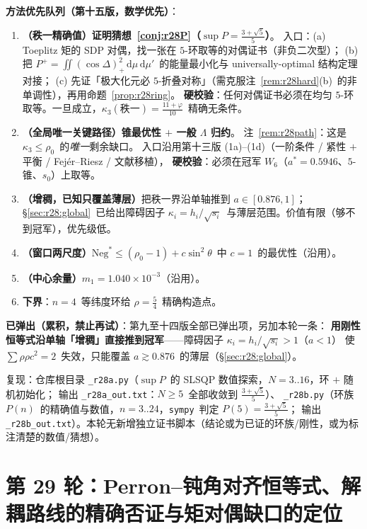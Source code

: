 \documentclass[UTF8,11pt]{ctexart}
\theoremstyle{definition}
\newcommand{\Lam}{\Lambda}
\newcommand{\dd}{\,\mathrm{d}}
\begin{document}
\textbf{方法优先队列（第十五版，数学优先）}：
\begin{enumerate}\itemsep=2pt
\item[\textbf{P1$'$}]\textbf{（秩一精确值）证明猜想~\ref{conj:r28P}（$\sup P=\frac{3+\sqrt5}5$）}。
入口：(a) Toeplitz 矩的 SDP 对偶，找一张在 $5$-环取等的对偶证书（非负二次型）；
(b) 把 $P^+=\iint(\cos\Delta)_+^2\dd\mu\dd\mu'$~的能量最小化与 universally-optimal 结构定理对接；
(c) 先证「极大化元必 $5$-折叠对称」（需克服注~\ref{rem:r28hard}(b)~的非单调性），再用命题~\ref{prop:r28ring}。
\textbf{硬校验}：任何对偶证书必须在均匀 $5$-环取等。一旦成立，$\kappa_3(\text{秩一})=\frac{11+\varphi}{10}$~精确无条件。
\item[\textbf{P1}]\textbf{（全局唯一关键路径）锥最优性 $+$ 一般 $\Lam$ 归约}。
注~\ref{rem:r28path}：这是 $\kappa_3\le\rho_0$~的\emph{唯一}剩余缺口。
入口沿用第十三版 (1a)--(1d)（一阶条件 / 紧性 $+$ 平衡 / Fej\'er--Riesz / 文献移植），
\textbf{硬校验}：必须在冠军 $W_6$（$a^*=0.5946$、$5$-锥、$s_0$）上取等。
\item[\textbf{P2}]\textbf{（增稠，已知只覆盖薄层）}把秩一界沿单轴推到 $a\in[0.876,1]$；
\S\ref{sec:r28:global}~已给出障碍因子 $\kappa_i=h_i/\sqrt{s_i}$~与薄层范围。价值有限（够不到冠军），优先级低。
\item[\textbf{P3}]\textbf{（窗口两尺度）}$\mathrm{Neg}^*\le(\rho_0-1)+c\sin^2\theta$~中 $c=1$~的最优性（沿用）。
\item[\textbf{P4}]\textbf{（中心余量）}$m_1=1.040\times10^{-3}$（沿用）。
\item[\textbf{副}]\textbf{下界}：$n=4$~等纬度环给 $\rho=\frac54$~精确构造点。
\end{enumerate}

\textbf{已弹出（累积，禁止再试）}：第九至十四版全部已弹出项，另加本轮一条：
\textbf{用刚性恒等式沿单轴「增稠」直接推到冠军}——障碍因子 $\kappa_i=h_i/\sqrt{s_i}>1$（$a<1$）
使 $\sum\rho\rho c^2=2$~失效，只能覆盖 $a\gtrsim0.876$~的薄层（\S\ref{sec:r28:global}）。

复现：仓库根目录 \texttt{\_r28a.py}（$\sup P$~的 SLSQP 数值探索，$N=3..16$，环 $+$ 随机初始化；
输出 \texttt{\_r28a\_out.txt}：$N\ge5$~全部收敛到 $\frac{3+\sqrt5}5$）、
\texttt{\_r28b.py}（环族 $P(n)$~的精确值与数值，$n=3..24$，\texttt{sympy}~判定 $P(5)=\frac{3+\sqrt5}5$；
输出 \texttt{\_r28b\_out.txt}）。本轮无新增独立证书脚本（结论或为已证的环族/刚性，或为标注清楚的数值/猜想）。


\section{第 29 轮：Perron--钝角对齐恒等式、解耦路线的精确否证与矩对偶缺口的定位}\label{sec:r29}
\end{document}
